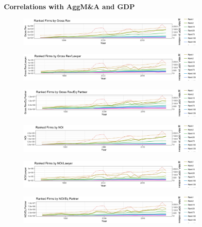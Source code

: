 \documentclass{article}
\begin{document}
\newpage
{\large \textbf{Correlations with AggM\&A and GDP} }
\begin{figure}[H]\centering
\includegraphics[width=0.85\textwidth]{../IndivTexOutput/MnAGDP-1.jpg}\end{figure}

\begin{figure}[H]\centering
\includegraphics[width=0.85\textwidth]{../IndivTexOutput/MnAGDP-2.jpg}\end{figure}

\begin{figure}[H]\centering
\includegraphics[width=0.85\textwidth]{../IndivTexOutput/MnAGDP-3.jpg}\end{figure}

\begin{figure}[H]\centering
\includegraphics[width=0.85\textwidth]{../IndivTexOutput/MnAGDP-4.jpg}\end{figure}

\begin{figure}[H]\centering
\includegraphics[width=0.85\textwidth]{../IndivTexOutput/MnAGDP-5.jpg}\end{figure}

\begin{figure}[H]\centering
\includegraphics[width=0.85\textwidth]{../IndivTexOutput/MnAGDP-6.jpg}\end{figure}
\end{document}
